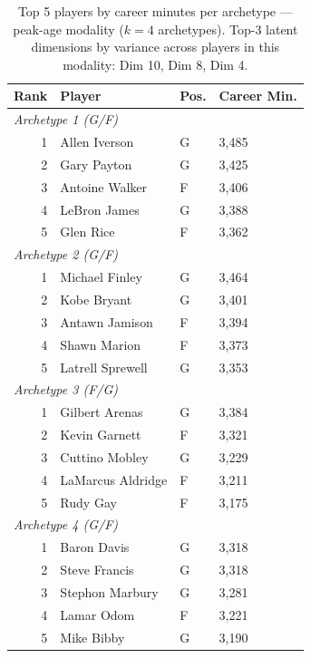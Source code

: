 \begin{table}[htbp]
  \centering\small
  \begin{tabular}{rlll}
    \toprule
    Rank & Player & Pos. & Career Min. \\
    \midrule
    \multicolumn{4}{l}{\textit{Archetype 1 (G/F)}} \\
    \midrule
    1 & Allen Iverson & G & 3,485 \\
    2 & Gary Payton & G & 3,425 \\
    3 & Antoine Walker & F & 3,406 \\
    4 & LeBron James & G & 3,388 \\
    5 & Glen Rice & F & 3,362 \\
    \midrule[0.4pt]
    \multicolumn{4}{l}{\textit{Archetype 2 (G/F)}} \\
    \midrule
    1 & Michael Finley & G & 3,464 \\
    2 & Kobe Bryant & G & 3,401 \\
    3 & Antawn Jamison & F & 3,394 \\
    4 & Shawn Marion & F & 3,373 \\
    5 & Latrell Sprewell & G & 3,353 \\
    \midrule[0.4pt]
    \multicolumn{4}{l}{\textit{Archetype 3 (F/G)}} \\
    \midrule
    1 & Gilbert Arenas & G & 3,384 \\
    2 & Kevin Garnett & F & 3,321 \\
    3 & Cuttino Mobley & G & 3,229 \\
    4 & LaMarcus Aldridge & F & 3,211 \\
    5 & Rudy Gay & F & 3,175 \\
    \midrule[0.4pt]
    \multicolumn{4}{l}{\textit{Archetype 4 (G/F)}} \\
    \midrule
    1 & Baron Davis & G & 3,318 \\
    2 & Steve Francis & G & 3,318 \\
    3 & Stephon Marbury & G & 3,281 \\
    4 & Lamar Odom & F & 3,221 \\
    5 & Mike Bibby & G & 3,190 \\
    \bottomrule
  \end{tabular}
  \caption{Top 5 players by career minutes per archetype --- peak-age modality ($k=4$ archetypes). Top-3 latent dimensions by variance across players in this modality: Dim 10, Dim 8, Dim 4.}
  \label{tab:arch_reps_peak_age}
\end{table}


